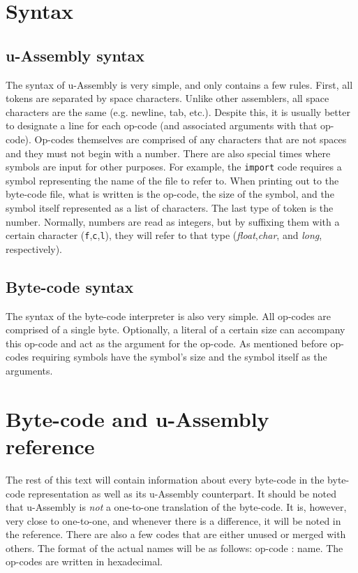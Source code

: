 \documentclass[12pt]{report}
\begin{document}
  \section{Syntax}
  \subsection{u-Assembly syntax}
  The syntax of u-Assembly is very simple, and only contains a few rules.  First, all
  tokens are separated by space characters.  Unlike other assemblers, all space
  characters are the same (e.g. newline, tab, etc.).  Despite this, it is usually
  better to designate a line for each op-code (and associated arguments with that
  op-code).  Op-codes themselves are comprised of any characters that are not
  spaces and they must not begin with a number.  There are also special times where
  symbols are input for other purposes.  For example, the \verb|import| code requires
  a symbol representing the name of the file to refer to.  When printing out to the
  byte-code file, what is written is the op-code, the size of the symbol, and
  the symbol itself represented as a list of characters.  The last type of token is
  the number.  Normally, numbers are read as integers, but by suffixing them with a
  certain character (\verb|f|,\verb|c|,\verb|l|), they will refer to that type
  (\emph{float},\emph{char}, and \emph{long}, respectively).
  \subsection{Byte-code syntax}
  The syntax of the byte-code interpreter is also very simple.  All op-codes are
  comprised of a single byte.  Optionally, a literal of a certain size can
  accompany this op-code and act as the argument for the op-code.  As mentioned before
  op-codes requiring symbols have the symbol's size and the symbol itself as the
  arguments.
  \section{Byte-code and u-Assembly reference}
  The rest of this text will contain information about every byte-code in the 
  byte-code representation as well as its u-Assembly counterpart.  It should be noted
  that u-Assembly is \emph{not} a one-to-one translation of the byte-code.  It is,
  however, very close to one-to-one, and whenever there is a difference, it will be
  noted in the reference.  There are also a few codes that are either unused or
  merged with others.  The format of the actual names will be as follows:
  op-code : name.  The op-codes are written in hexadecimal.
\end{document}
